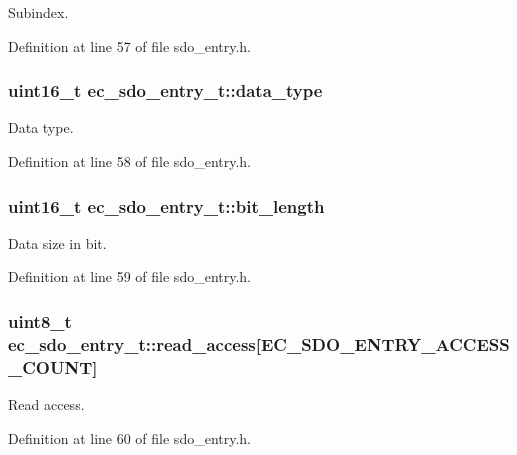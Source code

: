 \-Subindex. 



\-Definition at line 57 of file sdo\-\_\-entry.\-h.

\subsubsection[{data\-\_\-type}]{\setlength{\rightskip}{0pt plus 5cm}uint16\-\_\-t {\bf ec\-\_\-sdo\-\_\-entry\-\_\-t\-::data\-\_\-type}}\label{structec__sdo__entry__t_af4acb6fdd5f5e28da087056cc175ee5f}


\-Data type. 



\-Definition at line 58 of file sdo\-\_\-entry.\-h.

\subsubsection[{bit\-\_\-length}]{\setlength{\rightskip}{0pt plus 5cm}uint16\-\_\-t {\bf ec\-\_\-sdo\-\_\-entry\-\_\-t\-::bit\-\_\-length}}\label{structec__sdo__entry__t_af08992d35099a3fd0c28122ade246476}


\-Data size in bit. 



\-Definition at line 59 of file sdo\-\_\-entry.\-h.

\subsubsection[{read\-\_\-access}]{\setlength{\rightskip}{0pt plus 5cm}uint8\-\_\-t {\bf ec\-\_\-sdo\-\_\-entry\-\_\-t\-::read\-\_\-access}[{\bf \-E\-C\-\_\-\-S\-D\-O\-\_\-\-E\-N\-T\-R\-Y\-\_\-\-A\-C\-C\-E\-S\-S\-\_\-\-C\-O\-U\-N\-T}]}\label{structec__sdo__entry__t_ac352ad9037ebdf7ea4743bd27a4f6a3a}


\-Read access. 



\-Definition at line 60 of file sdo\-\_\-entry.\-h.


